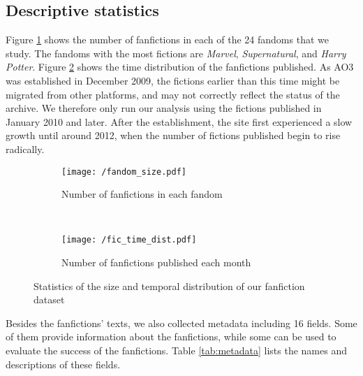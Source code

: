 \documentclass[a4paper]{article}
\begin{document}
\subsection*{Descriptive statistics}

Figure \ref{fig:fandom_size} shows the number of fanfictions in each of the 24 fandoms that we study. The fandoms with the most fictions are \emph{Marvel}, \emph{Supernatural}, and \emph{Harry Potter}. Figure \ref{fig:fic_time_dist}  shows the time distribution of the fanfictions published. As AO3 was established in December 2009, the fictions earlier than this time might be migrated from other platforms, and may not correctly reflect the status of the archive. We therefore only run our analysis using the fictions published in January 2010 and later. After the establishment, the site first experienced a slow growth until around 2012, when the number of fictions published begin to rise radically. 

\begin{figure}
    \centering
    \begin{subfigure}[b]{\textwidth}
        \texttt{[image: /fandom\_size.pdf]}
        \caption{Number of fanfictions in each fandom}
        \label{fig:fandom_size}
    \end{subfigure}
    ~ %
    \begin{subfigure}[b]{0.7\textwidth}
        \texttt{[image: /fic\_time\_dist.pdf]}
        \caption{Number of fanfictions published each month}
        \label{fig:fic_time_dist}
    \end{subfigure}
    \caption{Statistics of the size and temporal distribution of our fanfiction dataset}\label{fig:stats_size_time}
\end{figure}

Besides the fanfictions' texts, we also collected metadata including 16 fields. Some of them provide information about the fanfictions, while some can be used to evaluate the success of the fanfictions. Table \ref{tab:metadata} lists the names and descriptions of these fields. 
\end{document}
